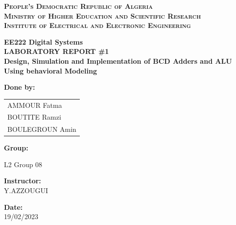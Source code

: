 \documentclass[a4paper, 12pt, english]{article}
\begin{document}

\begin{titlepage}
\begin{center}
\textsc{\Large \bfseries People's Democratic Republic of Algeria}\\[0.3cm] 
\textsc{\Large \bfseries Ministry of Higher Education and Scientific Research}\\[0.75cm] 
\textsc{\Large \bfseries Institute of Electrical and Electronic Engineering }\\[0.5cm]

\par
\vspace{20pt}
\textbf{\Large \bfseries EE222 Digital Systems}\\
\vspace{15pt}
\myrule[1pt][10pt]
\vspace{20pt}
\textbf{\LARGE  LABORATORY REPORT \#1}\\
\vspace{20pt}
\textbf{\large Design, Simulation and Implementation of BCD Adders and ALU Using behavioral Modeling}\\
\vspace{15pt}
\myrule[1pt][7pt]
\vspace{25pt}

\textbf {\large Done by:}\\[0.2cm]
\begin{center}
\begin{tabular}{ l }
 AMMOUR Fatma\\
 BOUTITE Ramzi\\
 BOULEGROUN Amin \\  
\end{tabular}
\end{center}


\textbf {\large Group:}
\begin{center}
  L2 Group 08 
\end{center}


\vspace{45pt}
\textbf {\large Instructor:}\\[0.2cm]
 Y.AZZOUGUI\\[0.1cm]
\end{center}

\par
\vfill
\begin{center}
	\textbf{Date:\\}
	\small{19/02/2023}\\
\end{center}
\end{titlepage}
\end{document}
